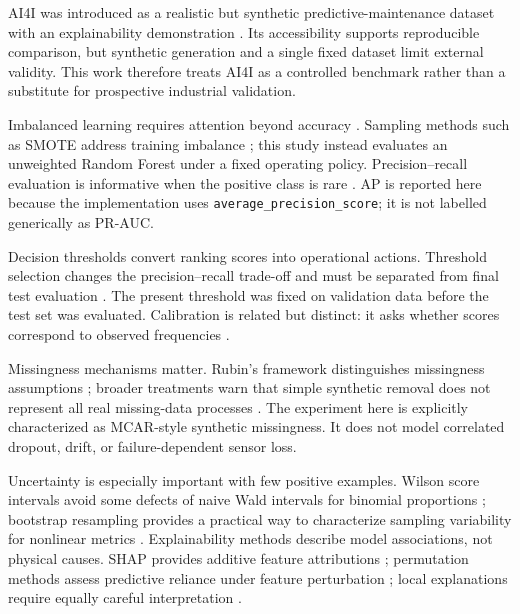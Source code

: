\documentclass[conference]{IEEEtran}
\begin{document}
AI4I was introduced as a realistic but synthetic predictive-maintenance dataset with an explainability demonstration \cite{matzka2020xai}. Its accessibility supports reproducible comparison, but synthetic generation and a single fixed dataset limit external validity. This work therefore treats AI4I as a controlled benchmark rather than a substitute for prospective industrial validation.

Imbalanced learning requires attention beyond accuracy \cite{he2009imbalance}. Sampling methods such as SMOTE address training imbalance \cite{chawla2002smote}; this study instead evaluates an unweighted Random Forest under a fixed operating policy. Precision--recall evaluation is informative when the positive class is rare \cite{saito2015pr,davis2006pr}. AP is reported here because the implementation uses \texttt{average\_precision\_score}; it is not labelled generically as PR-AUC.

Decision thresholds convert ranking scores into operational actions. Threshold selection changes the precision--recall trade-off and must be separated from final test evaluation \cite{lipton2014threshold}. The present threshold was fixed on validation data before the test set was evaluated. Calibration is related but distinct: it asks whether scores correspond to observed frequencies \cite{brier1950score,niculescu2005probabilities,guo2017calibration}.

Missingness mechanisms matter. Rubin's framework distinguishes missingness assumptions \cite{rubin1976missing}; broader treatments warn that simple synthetic removal does not represent all real missing-data processes \cite{little2019missing,vanbuuren2018imputation}. The experiment here is explicitly characterized as MCAR-style synthetic missingness. It does not model correlated dropout, drift, or failure-dependent sensor loss.

Uncertainty is especially important with few positive examples. Wilson score intervals avoid some defects of naive Wald intervals for binomial proportions \cite{wilson1927interval}; bootstrap resampling provides a practical way to characterize sampling variability for nonlinear metrics \cite{efron1993bootstrap}. Explainability methods describe model associations, not physical causes. SHAP provides additive feature attributions \cite{lundberg2017shap}; permutation methods assess predictive reliance under feature perturbation \cite{fisher2019reliance}; local explanations require equally careful interpretation \cite{ribeiro2016lime}.
\end{document}
